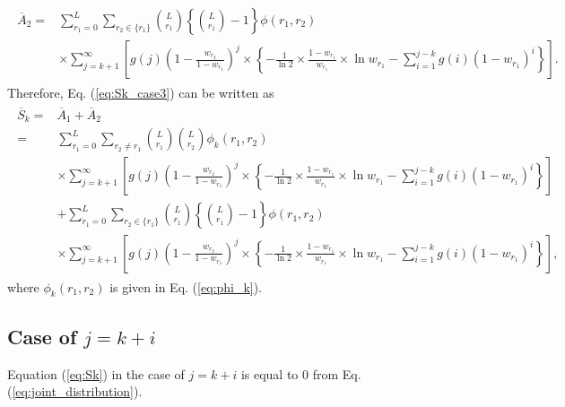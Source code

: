 \documentclass[dvipdfmx,english]{ampmt} %
\begin{document}
\begin{align}\begin{split}
	\overline{A}_2 =& \sum_{r_1=0}^{L} \sum_{r_2 \in \{r_1\}} \binom{L}{r_1}\left\{\binom{L}{r_1}-1\right\} \phi(r_1,r_2) \\
	&\times\sum_{j=k+1}^{\infty} \left[ g(j) \left(1-\frac{w_{r_2}}{1-w_{r_1}} \right)^{j} \times \left\{ -\frac{1}{\ln 2} \times \frac{1-w_{r_1}}{w_{r_1}} \times \ln w_{r_1} - \sum_{i=1}^{j-k} g(i)(1-w_{r_1})^{i} \right\} \right].
\end{split}\end{align}
%
Therefore, Eq. (\ref{eq:Sk_case3}) can be written as
\begin{align}\begin{split}
	\overline{S}_k =& \overline{A}_1 + \overline{A}_2 \\
	=& \sum_{r_1=0}^{L} \sum_{r_2 \neq r_1} \binom{L}{r_1}\binom{L}{r_2}\phi_k(r_1,r_2)\\
	&\times\sum_{j=k+1}^{\infty} \left[ g(j) \left(1-\frac{w_{r_2}}{1-w_{r_1}} \right)^{j} \times \left\{ -\frac{1}{\ln 2} \times \frac{1-w_{r_1}}{w_{r_1}} \times \ln w_{r_1} - \sum_{i=1}^{j-k} g(i)(1-w_{r_1})^{i} \right\} \right] \\
	&+\sum_{r_1=0}^{L} \sum_{r_2 \in \{r_1\}} \binom{L}{r_1}\left\{\binom{L}{r_1}-1\right\} \phi(r_1,r_2) \\
	&\times\sum_{j=k+1}^{\infty} \left[ g(j) \left(1-\frac{w_{r_2}}{1-w_{r_1}} \right)^{j} \times \left\{ -\frac{1}{\ln 2} 
	\times \frac{1-w_{r_1}}{w_{r_1}} \times \ln w_{r_1} - \sum_{i=1}^{j-k} g(i)(1-w_{r_1})^{i} \right\} \right],
\end{split}\end{align}
where $\phi_k(r_1,r_2)$ is given in Eq. (\ref{eq:phi_k}).
\subsection{Case of $j=k+i$}
Equation (\ref{eq:Sk}) in the case of $j=k+i$ is equal to $0$ from Eq. (\ref{eq:joint_distribution}).
\end{document}
